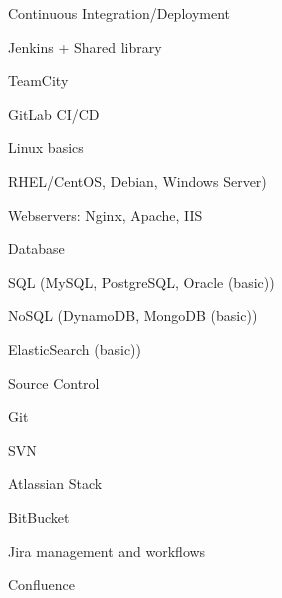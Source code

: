 \begin{cvskills}
  \cvskill
    {Continuous Integration/Deployment} %
    {
      \begin{cvitems} %
        \item {Jenkins + Shared library} %
        \item {TeamCity} %
        \item {GitLab CI/CD} %
      \end{cvitems}
    }

  \cvskill
    {Linux basics} %
    {
      \begin{cvitems} %
        \item {RHEL/CentOS, Debian, Windows Server)} %
        \item {Webservers: Nginx, Apache, IIS} %
      \end{cvitems}
    }

  \cvskill
    {Database} %
    {
      \begin{cvitems} %
        \item {SQL (MySQL, PostgreSQL, Oracle (basic))} %
        \item {NoSQL (DynamoDB, MongoDB (basic))} %
        \item {ElasticSearch (basic))} %
      \end{cvitems}
    }

  \cvskill
    {Source Control} %
    {
      \begin{cvitems} %
        \item {Git} %
        \item {SVN} %
      \end{cvitems}
    }

  \cvskill
    {Atlassian Stack} %
    {
      \begin{cvitems} %
        \item {BitBucket} %
        \item {Jira management and workflows} %
        \item {Confluence} %
      \end{cvitems}
    }


\end{cvskills}
